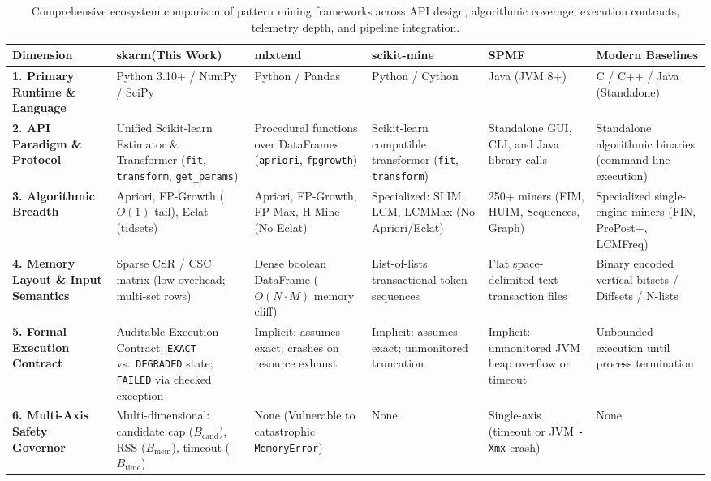 \documentclass[twocolumn,10pt]{article}
\newcommand{\skarm}{\textsf{skarm}\xspace}
\begin{document}
\begin{table}[t]
\centering
\footnotesize
\caption{Comprehensive ecosystem comparison of pattern mining frameworks across API design, algorithmic coverage, execution contracts, telemetry depth, and pipeline integration.}
\label{tab:ecosystem}
\setlength{\tabcolsep}{2.5pt}
\begin{tabular}{p{2.6cm}p{2.5cm}p{2.4cm}p{2.4cm}p{2.4cm}p{2.6cm}}
\toprule
\textbf{Dimension} & \textbf{\skarm (This Work)} & \textbf{mlxtend} \cite{mlxtend} & \textbf{scikit-mine} \cite{scikitmine} & \textbf{SPMF} \cite{spmf} & \textbf{Modern Baselines} \cite{kallay2025} \\
\midrule
\textbf{1. Primary Runtime \& Language} & Python 3.10+ / NumPy / SciPy & Python / Pandas & Python / Cython & Java (JVM 8+) & C / C++ / Java (Standalone) \\
\midrule
\textbf{2. API Paradigm \& Protocol} & Unified Scikit-learn Estimator \& Transformer (\texttt{fit}, \texttt{transform}, \texttt{get\_params}) & Procedural functions over DataFrames (\texttt{apriori}, \texttt{fpgrowth}) & Scikit-learn compatible transformer (\texttt{fit}, \texttt{transform}) & Standalone GUI, CLI, and Java library calls & Standalone algorithmic binaries (command-line execution) \\
\midrule
\textbf{3. Algorithmic Breadth} & Apriori, FP-Growth ($O(1)$ tail), Eclat (tidsets) & Apriori, FP-Growth, FP-Max, H-Mine (No Eclat) & Specialized: SLIM, LCM, LCMMax (No Apriori/Eclat) & 250+ miners (FIM, HUIM, Sequences, Graph) & Specialized single-engine miners (FIN, PrePost+, LCMFreq) \\
\midrule
\textbf{4. Memory Layout \& Input Semantics} & Sparse CSR / CSC matrix (low overhead; multi-set rows) & Dense boolean DataFrame ($O(N \cdot M)$ memory cliff) & List-of-lists transactional token sequences & Flat space-delimited text transaction files & Binary encoded vertical bitsets / Diffsets / N-lists \\
\midrule
\textbf{5. Formal Execution Contract} & Auditable Execution Contract: \texttt{EXACT} vs.\ \texttt{DEGRADED} state; \texttt{FAILED} via checked exception & Implicit: assumes exact; crashes on resource exhaust & Implicit: assumes exact; unmonitored truncation & Implicit: unmonitored JVM heap overflow or timeout & Unbounded execution until process termination \\
\midrule
\textbf{6. Multi-Axis Safety Governor} & Multi-dimensional: candidate cap ($B_{\text{cand}}$), RSS ($B_{\text{mem}}$), timeout ($B_{\text{time}}$) & None (Vulnerable to catastrophic \texttt{MemoryError}) & None & Single-axis (timeout or JVM \texttt{-Xmx} crash) & None \\

\end{tabular}
\end{table}
\end{document}
